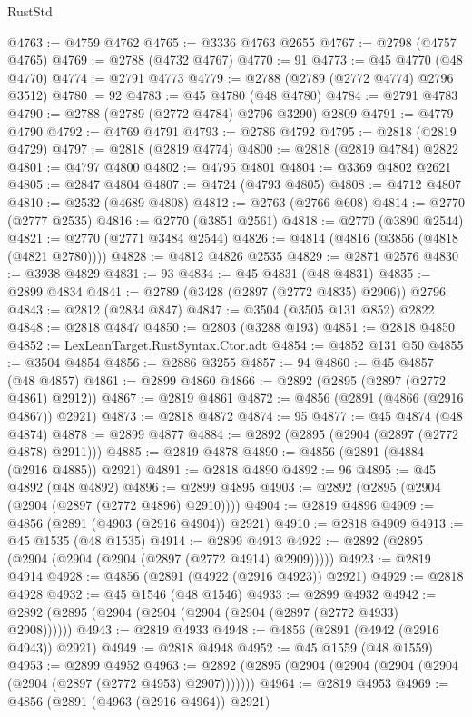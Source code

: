 \begin{lexlean}{RustStd}
\begin{coremodule}
@4763 := @4759 @4762
@4765 := @3336 @4763 @2655
@4767 := @2798 (@4757 @4765)
@4769 := @2788 (@4732 @4767)
@4770 := 91
@4773 := @45 @4770 (@48 @4770)
@4774 := @2791 @4773
@4779 := @2788 (@2789 (@2772 @4774) @2796 @3512)
@4780 := 92
@4783 := @45 @4780 (@48 @4780)
@4784 := @2791 @4783
@4790 := @2788 (@2789 (@2772 @4784) @2796 @3290) @2809
@4791 := @4779 @4790
@4792 := @4769 @4791
@4793 := @2786 @4792
@4795 := @2818 (@2819 @4729)
@4797 := @2818 (@2819 @4774)
@4800 := @2818 (@2819 @4784) @2822
@4801 := @4797 @4800
@4802 := @4795 @4801
@4804 := @3369 @4802 @2621
@4805 := @2847 @4804
@4807 := @4724 (@4793 @4805)
@4808 := @4712 @4807
@4810 := @2532 (@4689 @4808)
@4812 := @2763 (@2766 @608)
@4814 := @2770 (@2777 @2535)
@4816 := @2770 (@3851 @2561)
@4818 := @2770 (@3890 @2544)
@4821 := @2770 (@2771 @3484 @2544)
@4826 := @4814 (@4816 (@3856 (@4818 (@4821 @2780))))
@4828 := @4812 @4826 @2535
@4829 := @2871 @2576
@4830 := @3938 @4829
@4831 := 93
@4834 := @45 @4831 (@48 @4831)
@4835 := @2899 @4834
@4841 := @2789 (@3428 (@2897 (@2772 @4835) @2906)) @2796
@4843 := @2812 (@2834 @847)
@4847 := @3504 (@3505 @131 @852) @2822
@4848 := @2818 @4847
@4850 := @2803 (@3288 @193)
@4851 := @2818 @4850
@4852 := LexLeanTarget.RustSyntax.Ctor.adt
@4854 := @4852 @131 @50
@4855 := @3504 @4854
@4856 := @2886 @3255
@4857 := 94
@4860 := @45 @4857 (@48 @4857)
@4861 := @2899 @4860
@4866 := @2892 (@2895 (@2897 (@2772 @4861) @2912))
@4867 := @2819 @4861
@4872 := @4856 (@2891 (@4866 (@2916 @4867)) @2921)
@4873 := @2818 @4872
@4874 := 95
@4877 := @45 @4874 (@48 @4874)
@4878 := @2899 @4877
@4884 := @2892 (@2895 (@2904 (@2897 (@2772 @4878) @2911)))
@4885 := @2819 @4878
@4890 := @4856 (@2891 (@4884 (@2916 @4885)) @2921)
@4891 := @2818 @4890
@4892 := 96
@4895 := @45 @4892 (@48 @4892)
@4896 := @2899 @4895
@4903 := @2892 (@2895 (@2904 (@2904 (@2897 (@2772 @4896) @2910))))
@4904 := @2819 @4896
@4909 := @4856 (@2891 (@4903 (@2916 @4904)) @2921)
@4910 := @2818 @4909
@4913 := @45 @1535 (@48 @1535)
@4914 := @2899 @4913
@4922 := @2892 (@2895 (@2904 (@2904 (@2904 (@2897 (@2772 @4914) @2909)))))
@4923 := @2819 @4914
@4928 := @4856 (@2891 (@4922 (@2916 @4923)) @2921)
@4929 := @2818 @4928
@4932 := @45 @1546 (@48 @1546)
@4933 := @2899 @4932
@4942 := @2892 (@2895 (@2904 (@2904 (@2904 (@2904 (@2897 (@2772 @4933) @2908))))))
@4943 := @2819 @4933
@4948 := @4856 (@2891 (@4942 (@2916 @4943)) @2921)
@4949 := @2818 @4948
@4952 := @45 @1559 (@48 @1559)
@4953 := @2899 @4952
@4963 := @2892 (@2895 (@2904 (@2904 (@2904 (@2904 (@2904 (@2897 (@2772 @4953) @2907)))))))
@4964 := @2819 @4953
@4969 := @4856 (@2891 (@4963 (@2916 @4964)) @2921)

\end{coremodule}
\end{lexlean}
